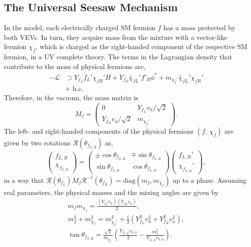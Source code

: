 \subsection{The Universal Seesaw Mechanism}
In the model, each electrically charged SM fermion $f$ has a mass protected by both VEVs. In turn, they  acquire mass from the mixture with a vector-like fermion $\chi_f$, which is charged as the right-handed component of the respective SM fermion, in a UV complete theory. The terms in the Lagrangian density that contribute to the mass of physical fermions are,
\begin{equation}
    \begin{aligned}
        -\mathcal{L}&\supset 
    Y_{f_L} \bar{f}_L' \chi_{fR}' H 
    +Y_{f_R} \bar\chi_{fL}' f'_R  \phi^* 
    + m_{\chi_f'} \bar{\chi}_{f L}' \chi_{f R}'\\
&+\text { h.c.}
    \end{aligned}
\end{equation}
Therefore, in the vacuum, the mass matrix is
\begin{equation}
    M_f=
    \begin{pmatrix}
    0 & Y_{f_L} v_h /\sqrt2\\
    Y_{f_R} v_\phi /\sqrt2 & m_{\chi_f'}    
    \end{pmatrix}.
\end{equation}
The left- and right-handed components of the physical fermions $(f,\,\chi_f)$ are given by two rotations $\mathcal R(\theta_{f_{L,R}})$ as, 
\begin{equation}
    \begin{pmatrix}
        f_{L,R}
        \\
        \chi_{f_{L,R}}
    \end{pmatrix}
    =
    \begin{pmatrix}
        \pm\cos\theta_{f_{L,R}} & \mp \sin \theta_{f_{L,R}}
        \\
        \sin \theta_{f_{L,R}} & \cos\theta_{f_{L,R}}
    \end{pmatrix}
    \begin{pmatrix}
        f_{L,R}'
        \\
        \chi_{f_{L,R}}'
    \end{pmatrix},
\end{equation}
in a way that $\mathcal{R}(\theta_{f_L})M_f\mathcal{R}^{-1}(\theta_{f_R})=\text{diag}(m_f,m_{\chi_f})$ up to a phase. Assuming real parameters, the physical masses and the mixing angles are given by
\begin{gather}
    m_f m_{\chi_f}=\frac{ \left(Y_{f_{L}} v_h\right) \left(Y_{f_R} v_\phi\right)}{2}, \label{eq:prodmass}
     \\ 
    m_f^2 + m_{\chi_f}^2 = m_{\chi_f'}^2 + \frac{1}{2}\left(Y_{f_L}^2v_h^2+Y_{f_R}^2v_\phi^2\right),\label{eq:summass}
    \\
    \tan \theta_{f_{L,R}} =  \frac{\sqrt 2}{m_{\chi_f'}}\left(\frac{Y_{f_{L,R}}v_{h,\phi}}{2} - 
    \frac{m_f^2}{Y_{f_{L,R}}v_{h,\phi}} \right).
\end{gather}

